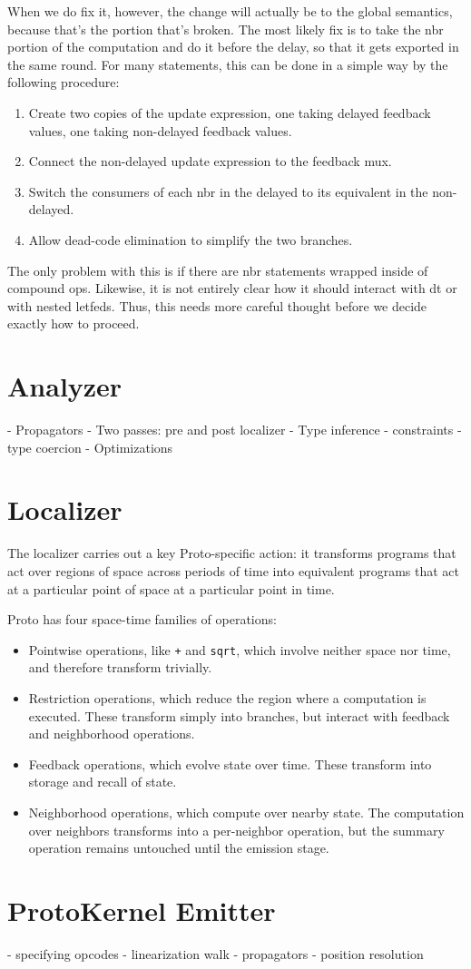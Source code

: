 \documentclass{article}
\begin{document}
When we do fix it, however, the change will actually be to the global semantics,
because that's the portion that's broken.  The most likely fix is to take the
nbr portion of the computation and do it before the delay, so that it gets
exported in the same round.  For many statements, this can be done in a simple
way by the following procedure:
\begin{enumerate}
\item Create two copies of the update expression, one taking delayed
feedback values, one taking non-delayed feedback values.
\item Connect the non-delayed update expression to the feedback mux.
\item Switch the consumers of each nbr in the delayed to its equivalent in the
non-delayed.
\item Allow dead-code elimination to simplify the two branches.
\end{enumerate}
The only problem with this is if there are nbr statements wrapped inside of
compound ops.  Likewise, it is not entirely clear how it should interact
with dt or with nested letfeds.  Thus, this needs more careful thought before we
decide exactly how to proceed.

\section{Analyzer}
- Propagators
- Two passes: pre and post localizer
- Type inference
  - constraints
  - type coercion
- Optimizations

\section{Localizer}

The localizer carries out a key Proto-specific action: it transforms programs
that act over regions of space across periods of time into equivalent programs
that act at a particular point of space at a particular point in time.  

Proto has four space-time families of operations:
\begin{itemize}
  \item Pointwise operations, like {\tt +} and {\tt sqrt}, which involve neither
  space nor time, and therefore transform trivially.
  \item Restriction operations, which reduce the region where a computation is
  executed.  These transform simply into branches, but interact with feedback
  and neighborhood operations.
  \item Feedback operations, which evolve state over time.  These transform into
  storage and recall of state.
  \item Neighborhood operations, which compute over nearby state.  The
  computation over neighbors transforms into a per-neighbor operation, but the
  summary operation remains untouched until the emission stage.
\end{itemize}

\section{ProtoKernel Emitter}
- specifying opcodes
- linearization walk
- propagators
- position resolution
\end{document}
